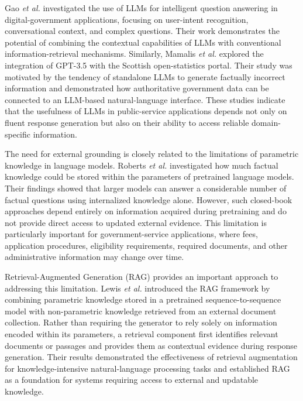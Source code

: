 \documentclass[10pt,journal,compsoc]{IEEEtran}
\begin{document}
     Gao \textit{et al.} \cite{gao2023digitalgovernment} investigated the use of LLMs for intelligent question answering in digital-government applications, focusing on user-intent recognition, conversational context, and complex questions. Their work demonstrates the potential of combining the contextual capabilities of LLMs with conventional information-retrieval mechanisms. Similarly, Mamalis \textit{et al.} \cite{mamalis2024opengovernment} explored the integration of GPT-3.5 with the Scottish open-statistics portal. Their study was motivated by the tendency of standalone LLMs to generate factually incorrect information and demonstrated how authoritative government data can be connected to an LLM-based natural-language interface. These studies indicate that the usefulness of LLMs in public-service applications depends not only on fluent response generation but also on their ability to access reliable domain-specific information.

The need for external grounding is closely related to the limitations of parametric knowledge in language models. Roberts \textit{et al.} \cite{roberts2020knowledge} investigated how much factual knowledge could be stored within the parameters of pretrained language models. Their findings showed that larger models can answer a considerable number of factual questions using internalized knowledge alone. However, such closed-book approaches depend entirely on information acquired during pretraining and do not provide direct access to updated external evidence. This limitation is particularly important for government-service applications, where fees, application procedures, eligibility requirements, required documents, and other administrative information may change over time.

Retrieval-Augmented Generation (RAG) provides an important approach to addressing this limitation. Lewis \textit{et al.} \cite{lewis2020rag} introduced the RAG framework by combining parametric knowledge stored in a pretrained sequence-to-sequence model with non-parametric knowledge retrieved from an external document collection. Rather than requiring the generator to rely solely on information encoded within its parameters, a retrieval component first identifies relevant documents or passages and provides them as contextual evidence during response generation. Their results demonstrated the effectiveness of retrieval augmentation for knowledge-intensive natural-language processing tasks and established RAG as a foundation for systems requiring access to external and updatable knowledge.
\end{document}
